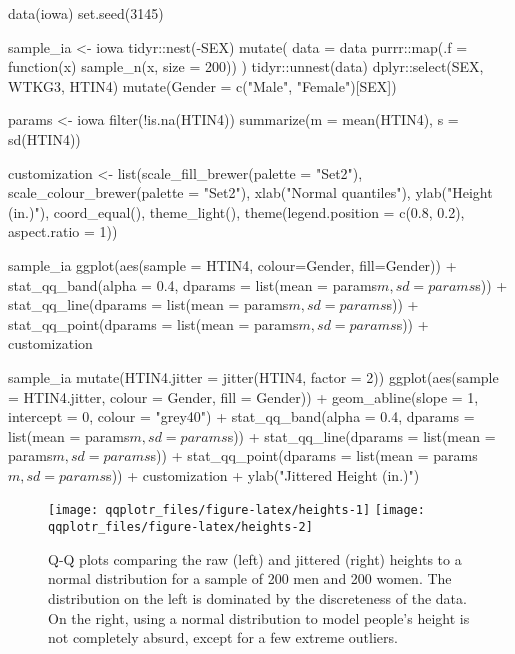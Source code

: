 \begin{Schunk}
\begin{Sinput}
data(iowa)
set.seed(3145)

sample_ia <- iowa %>% 
  tidyr::nest(-SEX) %>% 
  mutate(
    data = data %>% 
    purrr::map(.f = function(x) sample_n(x, size = 200))
    ) %>% 
  tidyr::unnest(data) %>% 
  dplyr::select(SEX, WTKG3, HTIN4) %>%
  mutate(Gender = c("Male", "Female")[SEX])

params <- iowa %>% 
  filter(!is.na(HTIN4)) %>% 
  summarize(m = mean(HTIN4), s = sd(HTIN4))

customization <- list(scale_fill_brewer(palette = "Set2"),
                      scale_colour_brewer(palette = "Set2"),
                      xlab("Normal quantiles"),
                      ylab("Height (in.)"),
                      coord_equal(),
                      theme_light(),
                      theme(legend.position = c(0.8, 0.2), aspect.ratio = 1))

sample_ia %>% 
  ggplot(aes(sample = HTIN4, colour=Gender, fill=Gender)) + 
  stat_qq_band(alpha = 0.4,
               dparams = list(mean = params$m, sd = params$s)) + 
  stat_qq_line(dparams = list(mean = params$m, sd = params$s)) + 
  stat_qq_point(dparams = list(mean = params$m, sd = params$s)) +
  customization

sample_ia %>% 
  mutate(HTIN4.jitter = jitter(HTIN4, factor = 2)) %>% 
  ggplot(aes(sample = HTIN4.jitter, colour = Gender, fill = Gender)) + 
  geom_abline(slope = 1, intercept = 0, colour = "grey40") +
  stat_qq_band(alpha = 0.4,
               dparams = list(mean = params$m, sd = params$s)) +
  stat_qq_line(dparams = list(mean = params$m, sd = params$s)) + 
  stat_qq_point(dparams = list(mean = params$m, sd = params$s)) +
  customization +
  ylab("Jittered Height (in.)") 
\end{Sinput}
\begin{figure}

{\centering \texttt{[image: qqplotr\_files/figure-latex/heights-1]} \texttt{[image: qqplotr\_files/figure-latex/heights-2]} 

}

\caption[Q-Q plots comparing the raw (left) and jittered (right) heights to a normal distribution for a sample of 200 men and 200 women]{Q-Q plots comparing the raw (left) and jittered (right) heights to a normal distribution for a sample of 200 men and 200 women. The distribution on the left is dominated by the discreteness of the data. On the right, using a normal distribution to model people's height is not completely absurd, except for a few extreme outliers.}\label{fig:heights}
\end{figure}
\end{Schunk}

